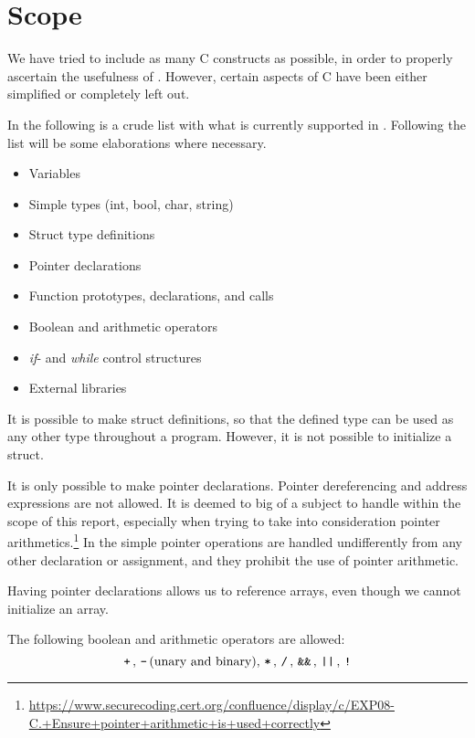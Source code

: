 
\section{Scope}
We have tried to include as many C constructs as possible, in order to properly ascertain the usefulness of \thelang.
However, certain aspects of C have been either simplified or completely left out.

In the following is a crude list with what is currently supported in \thelang.
Following the list will be some elaborations where necessary.
\begin{itemize}
  \item Variables
  \item Simple types (int, bool, char, string)
  \item Struct type definitions
  \item Pointer declarations
  \item Function prototypes, declarations, and calls
  \item Boolean and arithmetic operators
  \item \emph{if}- and \emph{while} control structures
  \item External libraries
\end{itemize}

It is possible to make struct definitions, so that the defined type can be used as any other type throughout a program.
However, it is not possible to initialize a struct.

It is only possible to make pointer declarations.
Pointer dereferencing and address expressions are not allowed.
It is deemed to big of a subject to handle within the scope of this report, especially when trying to take into consideration pointer arithmetics.\footnote{\url{https://www.securecoding.cert.org/confluence/display/c/EXP08-C.+Ensure+pointer+arithmetic+is+used+correctly}}
In \cite{muller2015cif} the simple pointer operations are handled undifferently from any other declaration or assignment, and they prohibit the use of pointer arithmetic.

Having pointer declarations allows us to reference arrays, even though we cannot initialize an array.

The following boolean and arithmetic operators are allowed:
\[ \, \texttt{+} \,, \, \texttt{-} \, \text{(unary and binary)}, \, \texttt{*} \,, \, \texttt{/} \,, \, \texttt{\&\&} \,, \, \texttt{||} \,, \, \texttt{!} \, \]

